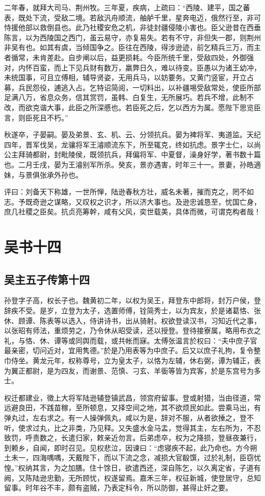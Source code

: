 \documentclass[12pt,UTF8]{ctexbook}
\begin{document}
二年春，就拜大司马、荆州牧。三年夏，疾病，上疏曰：“西陵、建平，国之蕃表，既处下流，受敌二境。若敌汎舟顺流，舳舻千里，星奔电迈，俄然行至，非可恃援他部以救倒县也。此乃社稷安危之机，非徒封疆侵陵小害也。臣父逊昔在西垂陈言，以为西陵国之西门，虽云易守，亦复易失。若有不守，非但失一郡，则荆州非吴有也。如其有虞，当倾国争之。臣往在西陵，得涉逊迹，前乞精兵三万，而主者循常，未肯差赴。自步阐以后，益更损耗。今臣所统千里，受敌四处，外御强对，内怀百蛮，而上下见兵财有数万，羸弊日久，难以待变。臣愚以为诸王幼冲，未统国事，可且立傅相，辅导贤姿，无用兵马，以妨要务。又黄门竖宦，开立占募，兵民怨役，逋逃入占。乞特诏简阅，一切料出，以补疆埸受敌常处，使臣所部足满八万，省息众务，信其赏罚，虽韩、白复生，无所展巧。若兵不增，此制不改，而欲克谐大事，此臣之所深慼也。若臣死之后，乞以西方为属。愿陛下思览臣言，则臣死且不朽。”

秋遂卒，子晏嗣。晏及弟景、玄、机、云、分领抗兵。晏为裨将军、夷道监。天纪四年，晋军伐吴，龙骧将军王濬顺流东下，所至辄克，终如抗虑。景字士仁，以尚公主拜骑都尉，封毗陵侯，既领抗兵，拜偏将军、中夏督，澡身好学，著书数十篇也。二月壬戌，晏为王濬别军所杀。癸亥，景亦遇害，时年三十一。景妻，孙皓適妹，与景俱张承外孙也。

评曰：刘备天下称雄，一世所惮，陆逊春秋方壮，威名未著，摧而克之，罔不如志。予既奇逊之谋略，又叹权之识才，所以济大事也。及逊忠诚恳至，忧国亡身，庶几社稷之臣矣。抗贞亮筹幹，咸有父风，奕世载美，具体而微，可谓克构者哉！

\part{吴书十四}
\chapter{吴主五子传第十四}

孙登字子高，权长子也。魏黄初二年，以权为吴王，拜登东中郎将，封万户侯，登辞疾不受。是岁，立登为太子，选置师傅，铨简秀士，以为宾友，於是诸葛恪、张休、顾谭、陈表等以选入，侍讲诗书，出从骑射。权欲登读汉书，习知近代之事，以张昭有师法，重烦劳之，乃令休从昭受读，还以授登。登待接寮属，略用布衣之礼，与恪、休、谭等或同舆而载，或共帐而寐。太傅张温言於权曰：“夫中庶子官最亲密，切问近对，宜用隽德。”於是乃用表等为中庶子。后又以庶子礼拘，复令整巾侍坐。黄龙元年，权称尊号，立为皇太子，以恪为左辅，休右弼，谭为辅正，表为翼正都尉，是为四友，而谢景、范慎、刁玄、羊衟等皆为宾客，於是东宫号为多士。

权迁都建业，徵上大将军陆逊辅登镇武昌，领宫府留事。登或射猎，当由径道，常远避良田，不践苗稼，至所顿息，又择空间之地，其不欲烦民如此。尝乘马出，有弹丸过，左右求之。有一人操弹佩丸，咸以为是，辞对不服，从者欲捶之，登不听，使求过丸，比之非类，乃见释。又失盛水金马盂，觉得其主，左右所为，不忍致罚，呼责数之，长遣归家，敕亲近勿言。后弟虑卒，权为之降损，登昼夜兼行，到赖乡，自闻，即时召见。见权悲泣，因谏曰：“虑寝疾不起，此乃命也。方今朔土未一，四海喁喁，天戴陛下，而以下流之念，减损大官殽馔，过於礼制，臣窃忧惶。”权纳其言，为之加膳。住十馀日，欲遣西还，深自陈乞，以久离定省，子道有阙，又陈陆逊忠勤，无所顾忧，权遂留焉。嘉禾三年，权征新城，使登居守，总知留事。时年谷不丰，颇有盗贼，乃表定科令，所以防御，甚得止奸之要。
\end{document}
